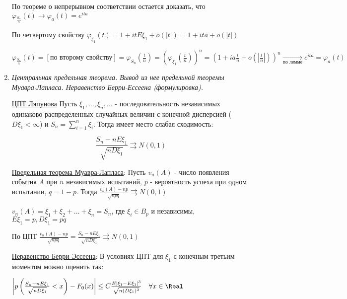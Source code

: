 \begin{enumerate}
\begin{MyProof}
        По теореме о непрерывном соответствии остается доказать, что $\varphi_{\frac{S_n}{n}}(t) \longrightarrow \varphi_a(t) = e^{ita}$
    
        По четвертому свойству $\varphi_{\xi_1}(t) = 1 + itE\xi_1 + o(|t|) = 1 + ita + o(|t|)$
    
        $\varphi_{\frac{S_n}{n}}(t) = [\text{по второму свойству}] = \varphi_{S_n}\left(\frac{t}{n}\right) = \left(\varphi_{\xi_1}\left(\frac{t}{n}\right)\right)^n = \left(1 + ia\frac{t}{n} + o\left(\left|\frac{t}{n}\right|\right)\right)^n \underset{\text{по лемме}}{\longrightarrow}
        e^{ita} = \varphi_a(t)$
    \end{MyProof}

    \item \textit{Центральная предельная теорема. Вывод из нее предельной теоремы Муавра-Лапласа. Неравенство Берри-Ессеена (формулировка). }

    \hyperlink{centrallimittheorem}{ЦПТ Ляпунова} \Ths Пусть $\xi_1, \dots, \xi_n, \dots$ - последовательность независимых одинаково распределенных случайных величин
    с конечной дисперсией ($D\xi_1 < \infty$) и $S_n = \sum_{i = 1}^n \xi_i$. Тогда имеет место слабая сходимость:

    \[\frac{S_n - nE\xi_1}{\sqrt{nD\xi_1}} \rightrightarrows N(0, 1)\]

    \hyperlink{limittheoremdemoivrelaplace}{Предельная теорема Муавра-Лапласа}: Пусть $v_n(A)$ - число появления события $A$ при $n$ независимых испытаний, $p$ - вероятность успеха при одном испытании, $q = 1 - p$.
    Тогда $\frac{v_n(A) - np}{\sqrt{npq}} \rightrightarrows N(0, 1)$

    \begin{MyProof}
        $v_n(A) = \xi_1 + \xi_2 + \dots + \xi_n = S_n$, где $\xi_i \in B_p$ и независимы, $E\xi_1 = p, D\xi_1 = pq$

        По ЦПТ $\frac{v_n(A) - np}{\sqrt{npq}} = \frac{S_n - nE\xi_1}{\sqrt{nD\xi_1}} \rightrightarrows N(0, 1)$
    \end{MyProof}

    \hyperlink{berryesseentheorem}{Неравенство Берри-Эссеена}: В условиях ЦПТ для $\xi_1$ с конечным третьим моментом можно оценить так:

    $\left|p\left(\frac{S_n - nE\xi_1}{\sqrt{nD\xi_1}} < x\right) - F_0(x)\right| \leq C\frac{E|\xi_1 - E\xi_1|^3}{\sqrt{n(D\xi_1)^3}} \quad \forall x \in \Real$


\end{enumerate}
